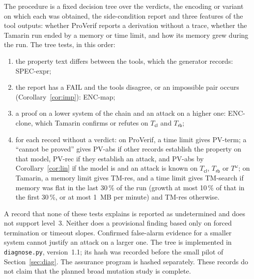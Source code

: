 The procedure is a fixed decision tree over the verdicts, the encoding or variant on which each was obtained, the side-condition report and three features of the tool outputs: whether ProVerif reports a derivation without a trace, whether the Tamarin run ended by a memory or time limit, and how its memory grew during the run. The tree tests, in this order:
\begin{enumerate}
\item the property text differs between the tools, which the generator records: SPEC-expr;
\item the report has a FAIL and the tools disagree, or an impossible pair occurs (Corollary~\ref{cor:imp}): ENC-map;
\item a proof on a lower system of the chain and an attack on a higher one: ENC-clone, which Tamarin confirms or refutes on $T_{\mathsf{cl}}$ and $T_{\mathsf{rb}}$;
\item for each record without a verdict: on ProVerif, a time limit gives PV-term; a ``cannot be proved'' gives PV-abs if other records establish the property on that model, PV-rec if they establish an attack, and PV-abs by Corollary~\ref{cor:lin} if the model is \PVlin and an attack is known on $T_{\mathsf{cl}}$, $T_{\mathsf{rb}}$ or $T^{\omega}$; on Tamarin, a memory limit gives TM-res, and a time limit gives TM-search if memory was flat in the last 30\,\% of the run (growth at most 10\,\% of that in the first 30\,\%, or at most 1~MB per minute) and TM-res otherwise.
\end{enumerate}
A record that none of these tests explains is reported as undetermined and does not support level~3. Neither does a provisional finding based only on forced termination or timeout slopes. Confirmed false-alarm evidence for a smaller system cannot justify an attack on a larger one. The tree is implemented in \texttt{diagnose.py}, version~1.1; its hash was recorded before the small pilot of Section~\ref{sec:diag}. The assurance program is hashed separately. These records do not claim that the planned broad mutation study is complete.
